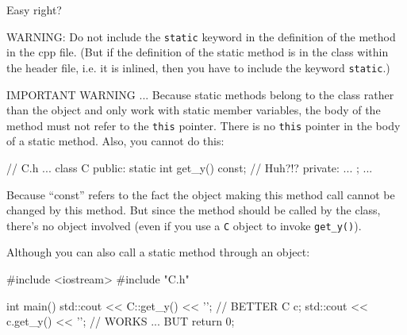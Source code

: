 Easy right?

WARNING: Do not include the \texttt{static} keyword in the definition of
the method in the cpp file. (But if the definition of the static method
is in the class within the header file, i.e. it is inlined, then you
have to include the keyword \texttt{static}.)

IMPORTANT WARNING ... Because static methods belong to the class rather
than the object and only work with static member variables, the body of
the method must not refer to the \texttt{this} pointer. There is no
\texttt{this} pointer in the body of a static method. Also, you cannot do
this:

\begin{consolethree}[escapeinside=||]
// C.h
...
class C
{
public:
    static int get_y() const; // Huh?!?
private:
    ...
};
...
\end{consolethree}

Because ``const'' refers to the fact the object making this method call
cannot be changed by this method. But since the method should be called
by the class, there's no object involved (even if you
use a \texttt{C} object to invoke \texttt{get\_y()}).

Although you can also call a static method through an object:

\begin{consolethree}[escapeinside=||]
#include <iostream>
#include "C.h"

int main()
{
    std::cout << C::get_y() << '\n'; // BETTER
    C c;
    std::cout << c.get_y() << '\n'; // WORKS ... BUT
    return 0;
}
\end{consolethree}




